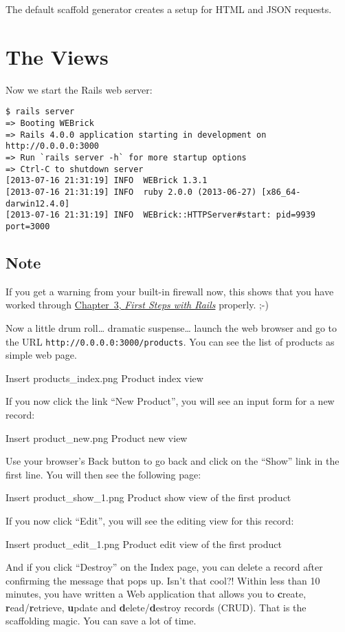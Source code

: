 \documentclass[a4paper]{book}
\newcommand{\chap}[1]{\newpage\thispagestyle{empty}\chapter{#1}\label{chap:\thechapter}}
\begin{document}
The default scaffold generator creates a setup for HTML and JSON requests.

\chap{The Views}\label{the-views}

Now we start the Rails web server:

\begin{shaded}\begin{verbatim}
$ rails server
=> Booting WEBrick
=> Rails 4.0.0 application starting in development on http://0.0.0.0:3000
=> Run `rails server -h` for more startup options
=> Ctrl-C to shutdown server
[2013-07-16 21:31:19] INFO  WEBrick 1.3.1
[2013-07-16 21:31:19] INFO  ruby 2.0.0 (2013-06-27) [x86_64-darwin12.4.0]
[2013-07-16 21:31:19] INFO  WEBrick::HTTPServer#start: pid=9939 port=3000
\end{verbatim}\end{shaded}

\section{Note}\label{note-33}

If you get a warning from your built-in firewall now, this shows that you have worked through \hyperref[ersteux5fschritteux5fmitux5frails]{Chapter~3, \emph{First Steps with Rails}} properly. ;-)

Now a little drum roll\ldots{} dramatic suspense\ldots{} launch the web browser and go to the URL \texttt{http://0.0.0.0:3000/products}. You can see the list of products as simple web page.

Insert products\_index.png Product index view

If you now click the link “New Product”, you will see an input form for a new record:

Insert product\_new.png Product new view

Use your browser's Back button to go back and click on the “Show” link in the first line. You will then see the following page:

Insert product\_show\_1.png Product show view of the first product

If you now click “Edit”, you will see the editing view for this record:

Insert product\_edit\_1.png Product edit view of the first product

And if you click “Destroy” on the Index page, you can delete a record after confirming the message that pops up. Isn't that cool?! Within less than 10 minutes, you have written a Web application that allows you to \textbf{c}reate, \textbf{r}ead/\textbf{r}etrieve, \textbf{u}pdate and \textbf{d}elete/\textbf{d}estroy records (CRUD). That is the scaffolding magic. You can save a lot of time.
\end{document}
